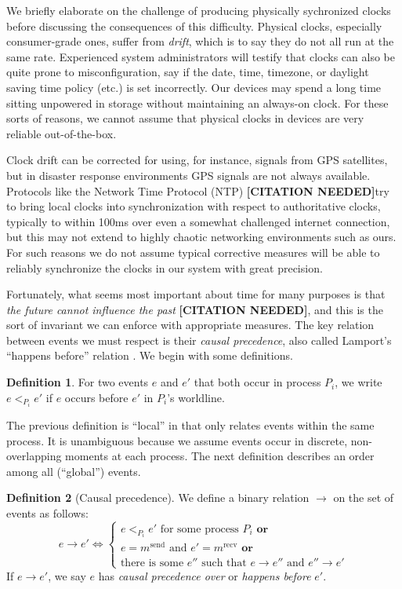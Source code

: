 \documentclass[]             %
{NASA}                       %
\theoremstyle{definition}
\newtheorem{definition}{Definition}[section]
\newcommand{\citationneeded}{\textbf{[CITATION NEEDED]}}
\begin{document}
We briefly elaborate on the challenge of producing physically
sychronized clocks before discussing the consequences of this
difficulty. Physical clocks, especially consumer-grade ones, suffer
from \emph{drift}, which is to say they do not all run at the same
rate. Experienced system administrators will testify that clocks can
also be quite prone to misconfiguration, say if the date, time,
timezone, or daylight saving time policy (etc.) is set
incorrectly. Our devices may spend a long time sitting unpowered in
storage without maintaining an always-on clock. For these sorts of
reasons, we cannot assume that physical clocks in devices are very
reliable out-of-the-box.

Clock drift can be corrected for using, for instance, signals from GPS
satellites, but in disaster response environments GPS signals are not
always available. Protocols like the Network Time Protocol (NTP)
\citationneeded try to bring local clocks into synchronization with
respect to authoritative clocks, typically to within 100ms over even a
somewhat challenged internet connection, but this may not extend to
highly chaotic networking environments such as ours. For such reasons
we do not assume typical corrective measures will be able to reliably
synchronize the clocks in our system with great precision.

Fortunately, what seems most important about time for many purposes is
that \emph{the future cannot influence the past} \citationneeded, and
this is the sort of invariant we can enforce with appropriate
measures. The key relation between events we must respect is their
\emph{causal precedence}, also called Lamport's ``happens before''
relation \cite{1978:lamportclocks}. We begin with some definitions.

\begin{definition}
  For two events $e$ and $e'$ that both occur in process $P_i$, we
  write $e <_{P_i} e'$ if $e$ occurs before $e'$ in $P_i$'s
  worldline.
\end{definition}
The previous definition is ``local'' in that only relates events
within the same process. It is unambiguous because we assume events
occur in discrete, non-overlapping moments at each process. The next
definition describes an order among all (``global'') events.

\begin{definition}[Causal precedence]
  \label{def:causalprecedence}
  We define a binary relation $\to$ on the set of events as follows:
  \[e \to e' \iff
  \begin{cases}
    e <_{P_i} e' \textrm{ for some process $P_i$}
    \textbf{ or} \\
    e = m^\textrm{send} \textrm{ and } e' = m^\textrm{recv}
    \textbf{ or} \\
    \textrm{there is some } e'' \textrm{ such that } e \to e'' \textrm{ and } e'' \to e'
  \end{cases}
  \]
  If $e \to e'$, we say $e$ has \emph{causal precedence over} or
  \emph{happens before} $e'$.
\end{definition}%
\end{document}

